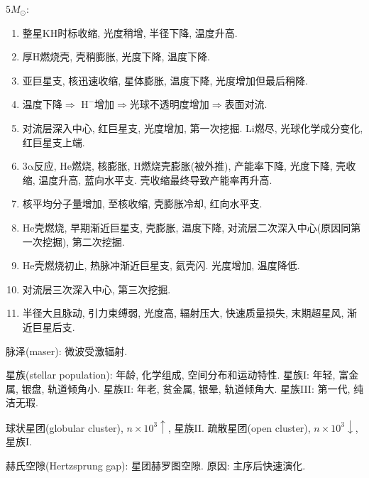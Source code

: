 $5M_\odot$:
\begin{enumerate}
    \item 整星KH时标收缩, 光度稍增, 半径下降, 温度升高.
    \item 厚$\text{H}$燃烧壳, 壳稍膨胀, 光度下降, 温度下降.
    \item 亚巨星支, 核迅速收缩, 星体膨胀, 温度下降, 光度增加但最后稍降.
    \item 温度下降$\Longrightarrow$ $\text{H}^-$增加$\Longrightarrow$光球不透明度增加$\Longrightarrow$表面对流.
    \item 对流层深入中心, 红巨星支, 光度增加, 第一次挖掘. $\text{Li}$燃尽, 光球化学成分变化, 红巨星支上端.
    \item 3$\mathrm{\alpha}$反应, $\text{He}$燃烧, 核膨胀, $\text{H}$燃烧壳膨胀(被外推), 产能率下降, 光度下降, 壳收缩, 温度升高, 蓝向水平支.  壳收缩最终导致产能率再升高.
    \item 核平均分子量增加, 至核收缩, 壳膨胀冷却, 红向水平支.
    \item $\text{He}$壳燃烧, 早期渐近巨星支, 壳膨胀, 温度下降, 对流层二次深入中心(原因同第一次挖掘), 第二次挖掘.
    \item $\text{He}$壳燃烧初止, 热脉冲渐近巨星支, 氦壳闪. 光度增加, 温度降低.
    \item 对流层三次深入中心, 第三次挖掘.
    \item 半径大且脉动, 引力束缚弱, 光度高, 辐射压大, 快速质量损失, 末期超星风, 渐近巨星后支.
\end{enumerate}

脉泽(maser): 微波受激辐射.

星族(stellar population): 年龄, 化学组成, 空间分布和运动特性. 星族I: 年轻, 富金属, 银盘, 轨道倾角小. 星族II: 年老, 贫金属, 银晕, 轨道倾角大. 星族III: 第一代, 纯洁无瑕.

球状星团(globular cluster), $n\times10^3\uparrow$, 星族II. 疏散星团(open cluster), $n\times10^3\downarrow$, 星族I.

赫氏空隙(Hertzsprung gap): 星团赫罗图空隙. 原因: 主序后快速演化.
